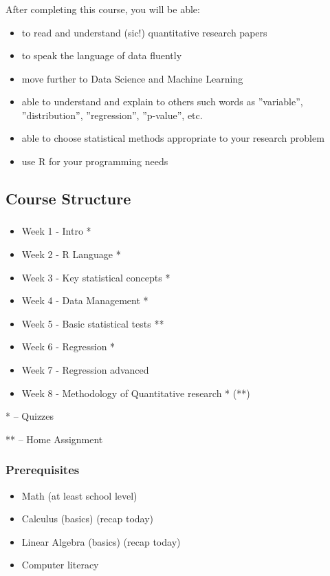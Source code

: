 \documentclass[t, 11pt]{beamer}
\begin{document}
\begin{frame}\label{}
	\frametitle{\insertsection}
	\frametitle{\insertsubsection}
	
		After completing this course, you will be able: 
		\begin{itemize}
			\item to read and understand (sic!) quantitative research papers 
			\item to speak the language of data fluently
			\item move further to Data Science and Machine Learning 
			\item able to understand and explain to others such words as ”variable”, ”distribution”, ”regression”, ”p-value”, etc.
			\item able to choose statistical methods appropriate to your research problem 
			\item use R for your programming needs
		\end{itemize}
\end{frame}

	
	\subsection{Course Structure} \label{}
	\begin{frame}
		\frametitle{\insertsection}
		\frametitle{\insertsubsection}  
	\begin{itemize}
    \item Week 1 - Intro *
 	\item Week 2 - R Language *
	\item Week 3 - Key statistical concepts *
	\item Week 4 - Data Management * 
    \item Week 5 - Basic statistical tests **
    \item Week 6 - Regression * 
    \item Week 7 - Regression advanced
    \item Week 8 - Methodology of Quantitative research * (**)
 \end{itemize}
 \vspace{1cm}
 * -- Quizzes
 
 ** -- Home Assignment
\end{frame}

	\begin{frame}
	\frametitle{\insertsection}
	\frametitle{Prerequisites}  
	\begin{itemize}
	
		\item Math (at least school level)
		\item Calculus (basics) (recap today)
		\item Linear Algebra (basics) (recap today)
		\item Computer literacy 
		
	\end{itemize}
\end{frame}
\end{document}

